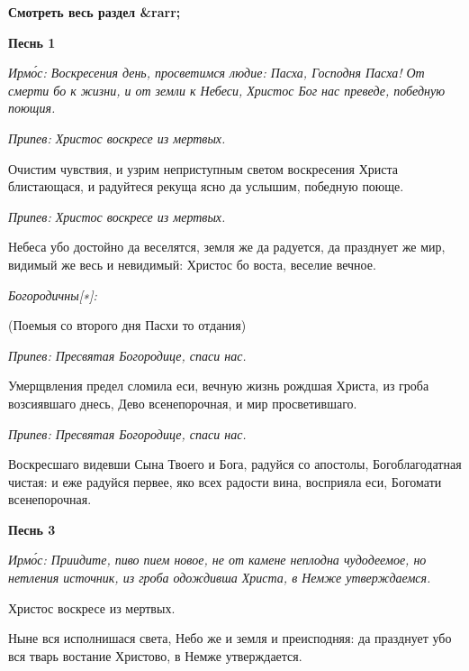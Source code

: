 




\bfseries Смотреть весь раздел &rarr;\normalfont{} 







\bfseries Песнь 1\normalfont{}


\itshape Ирмо́с:\normalfont{} Воскресения день, просветимся людие: Пасха, Господня Пасха! От смерти бо к жизни, и от земли к Небеси, Христос Бог нас преведе, победную поющия.


\itshape Припев:\normalfont{} Христос воскресе из мертвых.


Очистим чувствия, и узрим неприступным светом воскресения Христа блистающася, и радуйтеся рекуща ясно да услышим, победную поюще.


\itshape Припев:\normalfont{} Христос воскресе из мертвых.


Небеса убо достойно да веселятся, земля же да радуется, да празднует же мир, видимый же весь и невидимый: Христос бо воста, веселие вечное.


\itshape Богородичны[∗]:


(Поемыя со второго дня Пасхи то отдания)\normalfont{}


\itshape Припев:\normalfont{} Пресвятая Богородице, спаси нас.


Умерщвления предел сломила еси, вечную жизнь рождшая Христа, из гроба возсиявшаго днесь, Дево всенепорочная, и мир просветившаго.


\itshape Припев:\normalfont{} Пресвятая Богородице, спаси нас.


Воскресшаго видевши Сына Твоего и Бога, радуйся со апостолы, Богоблагодатная чистая: и еже радуйся первее, яко всех радости вина, восприяла еси, Богомати всенепорочная.





\bfseries Песнь 3\normalfont{}


\itshape Ирмо́с:\normalfont{} Приидите, пиво пием новое, не от камене неплодна чудодеемое, но нетления источник, из гроба одождивша Христа, в Немже утверждаемся.


Христос воскресе из мертвых.


Ныне вся исполнишася света, Небо же и земля и преисподняя: да празднует убо вся тварь востание Христово, в Немже утверждается.


